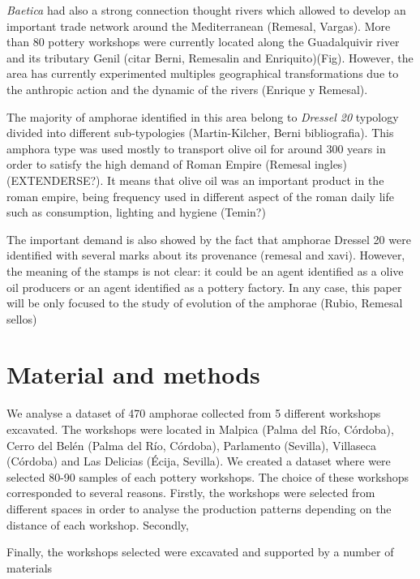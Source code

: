 \documentclass[review]{elsarticle}
\begin{document}
\emph{Baetica} had also a strong connection thought rivers which allowed to develop an important trade network around the Mediterranean (Remesal, Vargas). More than 80 pottery workshops were currently located along the Guadalquivir river and its tributary Genil (citar Berni, Remesalin and Enriquito)(Fig). However, the area has currently experimented multiples geographical transformations due to the anthropic action and the dynamic of the rivers (Enrique y Remesal). 

The majority of amphorae identified in this area belong to \emph{Dressel 20} typology divided into different sub-typologies (Martin-Kilcher, Berni bibliografia). This amphora type was used mostly to transport olive oil for around 300 years in order to satisfy the high demand of Roman Empire (Remesal ingles) (EXTENDERSE?). 
It means that olive oil was an important product in the roman empire, being frequency used in different aspect of the roman daily life such as consumption, lighting and hygiene (Temin?)

The important demand is also showed by the fact that amphorae Dressel 20 were identified with several marks about its provenance (remesal and xavi). However, the meaning of the stamps is not clear: it could be an agent identified as a olive oil producers or an agent identified as a pottery factory. In any case, this paper will be only focused to the study of evolution of the amphorae (Rubio, Remesal sellos) 

\section{Material and methods}

We analyse a dataset of 470 amphorae collected from 5 different workshops excavated. 
The workshops were located in Malpica (Palma del R\'io, C\'ordoba), Cerro del Bel\'en (Palma del R\'io, C\'ordoba), Parlamento (Sevilla), Villaseca (C\'ordoba) and Las Delicias (\'Ecija, Sevilla). We created a dataset where were selected 80-90 samples of each pottery workshops. The choice of these workshops corresponded to several reasons. Firstly, the workshops were selected from different spaces in order to analyse the production patterns depending on the distance of each workshop. Secondly,  


Finally, the workshops selected were excavated and supported by a number of materials   
\end{document}
